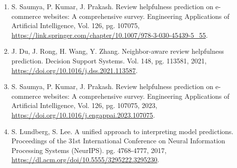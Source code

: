 \documentclass[12pt]{article}
\begin{document}
\begin{enumerate}
\item S. Saumya, P. Kumar, J. Prakash. Review helpfulness prediction on e-commerce websites: A comprehensive survey. Engineering Applications of Artificial Intelligence, Vol. 126, pg. 107075,
\url{https://link.springer.com/chapter/10.1007/978-3-030-45439-5_55}.

\item J. Du, J. Rong, H. Wang, Y. Zhang. Neighbor-aware review helpfulness prediction. Decision Support Systems. Vol. 148, pg. 113581, 2021,
\url{https://doi.org/10.1016/j.dss.2021.113587}.

\item S. Saumya, P. Kumar, J. Prakash. Review helpfulness prediction on e-commerce websites: A comprehensive survey. Engineering Applications of Artificial Intelligence, Vol. 126, pg. 107075, 2023,   
\url{https://doi.org/10.1016/j.engappai.2023.107075}. 

\item S. Lundberg, S. Lee. A unified approach to interpreting model predictions. Proceedings of the 31st International Conference on Neural Information Processing Systems (NeurIPS). pg. 4768-4777, 2017,     
\url{https://dl.acm.org/doi/10.5555/3295222.3295230}.

\end{enumerate}
\end{document}
